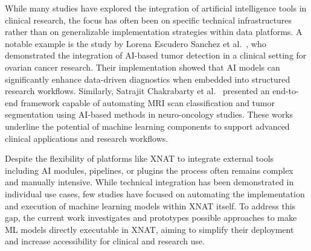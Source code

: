 While many studies have explored the integration of artificial intelligence tools in clinical research, the focus has often been on specific technical infrastructures rather than on generalizable implementation strategies within data platforms. A notable example is the study by Lorena Escudero Sanchez et al.~\cite{escudero_sanchez_integrating_2023}, who demonstrated the integration of AI-based tumor detection in a clinical setting for ovarian cancer research. Their implementation showed that AI models can significantly enhance data-driven diagnostics when embedded into structured research workflows. Similarly, Satrajit Chakrabarty et al.~\cite{chakrabarty_deep_2023} presented an end-to-end framework capable of automating \ac{MRI} scan classification and tumor segmentation using AI-based methods in neuro-oncology studies. These works underline the potential of machine learning components to support advanced clinical applications and research workflows.

Despite the flexibility of platforms like XNAT to integrate external tools including AI modules, pipelines, or plugins the process often remains complex and manually intensive. While technical integration has been demonstrated in individual use cases, few studies have focused on automating the implementation and execution of machine learning models within XNAT itself. To address this gap, the current work investigates and prototypes possible approaches to make \ac{ML} models directly executable in XNAT, aiming to simplify their deployment and increase accessibility for clinical and research use.
















 

